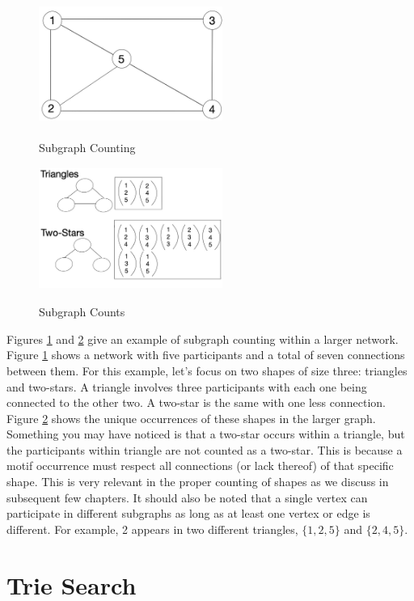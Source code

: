 \documentclass[12pt,twoside]{reedthesis}
\begin{document}
\begin{figure}[h]
	\caption{Subgraph Counting}
	\centering
	\includegraphics[width=6cm, height=4cm]{subgraphs}
	\label{fig:subgraphs}
\end{figure}

\begin{figure}[h]
	\caption{Subgraph Counts}
	\centering
	\includegraphics[width=6cm, height=4cm]{subgraph_motifs}
	\label{fig:subgraph_counts}
\end{figure}

Figures \ref{fig:subgraphs} and \ref{fig:subgraph_counts} give an example of subgraph counting within a larger network. Figure \ref{fig:subgraphs} shows a network with five participants and a total of seven connections between them. For this example, let's focus on two shapes of size three: triangles and two-stars. A triangle involves three participants with each one being connected to the other two. A two-star is the same with one less connection. Figure \ref{fig:subgraph_counts} shows the unique occurrences of these shapes in the larger graph. Something you may have noticed is that a two-star occurs within a triangle, but the participants within triangle are not counted as a two-star. This is because a motif occurrence must respect all connections (or lack thereof) of that specific shape. This is very relevant in the proper counting of shapes as we discuss in subsequent few chapters. It should also be noted that a single vertex can participate in different subgraphs as long as at least one vertex or edge is different. For example, 2 appears in two different triangles, $\{1,2,5\}$ and $\{2,4,5\}$.
	

\section{Trie Search}
\end{document}
